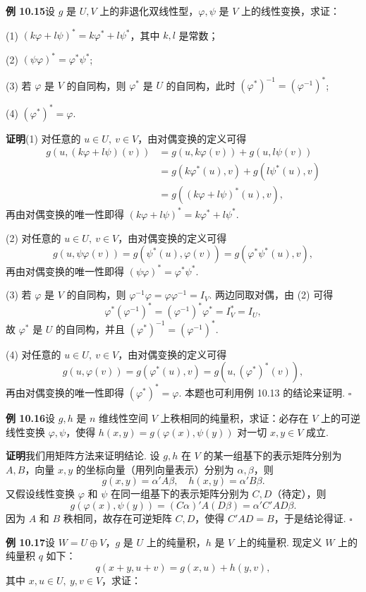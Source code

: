\documentclass[UTF8,12pt,a4paper,fontset=fandol]{ctexart}
\begin{document}
\noindent\textbf{例 10.15}\quad 设 $g$ 是 $U,V$ 上的非退化双线性型，$\varphi,\psi$ 是 $V$ 上的线性变换，求证：

(1) $(k\varphi+l\psi)^*=k\varphi^*+l\psi^*$，其中 $k,l$ 是常数；

(2) $(\psi\varphi)^*=\varphi^*\psi^*$;

(3) 若 $\varphi$ 是 $V$ 的自同构，则 $\varphi^*$ 是 $U$ 的自同构，此时 $(\varphi^*)^{-1}=(\varphi^{-1})^*$;

(4) $(\varphi^*)^*=\varphi$.

\noindent\textbf{证明}\quad (1) 对任意的 $u\in U,\ v\in V$，由对偶变换的定义可得
\[
\begin{aligned}
g(u,(k\varphi+l\psi)(v))
&=g(u,k\varphi(v))+g(u,l\psi(v))\\
&=g(k\varphi^*(u),v)+g(l\psi^*(u),v)\\
&=g((k\varphi+l\psi)^*(u),v),
\end{aligned}
\]
再由对偶变换的唯一性即得 $(k\varphi+l\psi)^*=k\varphi^*+l\psi^*$.

(2) 对任意的 $u\in U,\ v\in V$，由对偶变换的定义可得
\[
g(u,\psi\varphi(v))=g(\psi^*(u),\varphi(v))=g(\varphi^*\psi^*(u),v),
\]
再由对偶变换的唯一性即得 $(\psi\varphi)^*=\varphi^*\psi^*$.

(3) 若 $\varphi$ 是 $V$ 的自同构，则 $\varphi^{-1}\varphi=\varphi\varphi^{-1}=I_V$. 两边同取对偶，由 (2) 可得
\[
\varphi^*(\varphi^{-1})^*=(\varphi^{-1})^*\varphi^*=I_V^*=I_U,
\]
故 $\varphi^*$ 是 $U$ 的自同构，并且 $(\varphi^*)^{-1}=(\varphi^{-1})^*$.

(4) 对任意的 $u\in U,\ v\in V$，由对偶变换的定义可得
\[
g(u,\varphi(v))=g(\varphi^*(u),v)=g(u,(\varphi^*)^*(v)),
\]
再由对偶变换的唯一性即得 $(\varphi^*)^*=\varphi$. 本题也可利用例 10.13 的结论来证明. $\square$

\noindent\textbf{例 10.16}\quad 设 $g,h$ 是 $n$ 维线性空间 $V$ 上秩相同的纯量积，求证：必存在 $V$ 上的可逆线性变换 $\varphi,\psi$，使得 $h(x,y)=g(\varphi(x),\psi(y))$ 对一切 $x,y\in V$ 成立.

\noindent\textbf{证明}\quad 我们用矩阵方法来证明结论. 设 $g,h$ 在 $V$ 的某一组基下的表示矩阵分别为 $A,B$，向量 $x,y$ 的坐标向量（用列向量表示）分别为 $\alpha,\beta$，则
\[
g(x,y)=\alpha'A\beta,\quad h(x,y)=\alpha'B\beta.
\]
又假设线性变换 $\varphi$ 和 $\psi$ 在同一组基下的表示矩阵分别为 $C,D$（待定），则
\[
g(\varphi(x),\psi(y))=(C\alpha)'A(D\beta)=\alpha'C'AD\beta.
\]
因为 $A$ 和 $B$ 秩相同，故存在可逆矩阵 $C,D$，使得 $C'AD=B$，于是结论得证. $\square$

\noindent\textbf{例 10.17}\quad 设 $W=U\oplus V$，$g$ 是 $U$ 上的纯量积，$h$ 是 $V$ 上的纯量积. 现定义 $W$ 上的纯量积 $q$ 如下：
\[
q(x+y,u+v)=g(x,u)+h(y,v),
\]
其中 $x,u\in U,\ y,v\in V$，求证：
\end{document}
